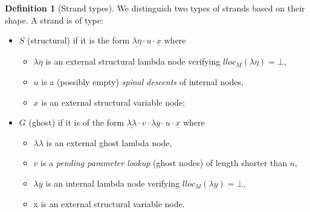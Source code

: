 \documentclass{article}
\theoremstyle{plain}
\theoremstyle{definition}
\newtheorem{definition}{Definition}[section]
\theoremstyle{remark}
\newcommand{\ghostlmd}{{\lambda\!\!\lambda}}
\begin{document}
\begin{definition}[Strand types]
    \label{def:strandtypes} We distinguish two types of strands based on their shape. A strand is of type:
    \begin{itemize}
        \item $S$ (structural) if it is the form $\underline{\lambda\overline{\eta}} \cdot u \cdot \underline{x}$
            where
            \begin{itemize}
            \item $\lambda\overline{\eta}$ is an external structural lambda node verifying $lloc_M(\lambda\overline\eta) = \bot$,
            \item $u$ is a (possibly empty) \emph{spinal descents} of internal nodes,
            \item $x$ is an external structural variable node;
            \end{itemize}

        \item $G$ (ghost) if it is of the form $\underline{\ghostlmd} \cdot  v \cdot \lambda\overline{y} \cdot u \cdot \underline{x}$
        where
        \begin{itemize}
            \item $\ghostlmd$ is an external ghost lambda node,
            \item $v$ is a \emph{pending parameter lookup} (ghost nodes) of length shorter than $u$,
            \item $\lambda\overline{y}$ is an internal lambda node verifying $lloc_M(\lambda\overline{y}) = \bot$,
            \item x is an external structural variable node.
        \end{itemize}
    \end{itemize}
\end{definition}
\end{document}
